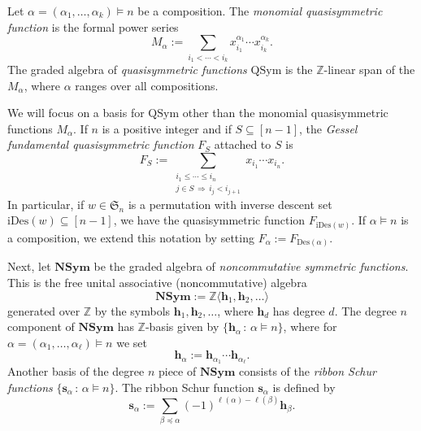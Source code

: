 \documentclass[ALCO,ThmDefs,published]{cedram}
\newcommand{\symm}{{\mathfrak{S}}}
\theoremstyle{plain}
\newcommand{\Des}{{\mathrm {Des}}}
\newcommand{\NSym}{{\mathbf {NSym}}}
\newcommand{\Sym}{{\mathrm {Sym}}}
\newcommand{\QSym}{{\mathrm {QSym}}}
\newcommand{\iDes}{{\mathrm {iDes}}}
\newcommand{\symm}{{\mathfrak{S}}}
\newcommand{\ZZ}{{\mathbb {Z}}}
\newcommand{\sss}{{\mathbf{s}}}
\begin{document}
Let $\alpha = (\alpha_1, \dots, \alpha_k) \models n$ be a composition.  The \emph{monomial quasisymmetric
function} is the formal power series
\begin{equation}
M_{\alpha} := \sum_{i_1 < \cdots < i_k} x_{i_1}^{\alpha_1} \cdots x_{i_k}^{\alpha_k}.
\end{equation}
The graded algebra of \emph{quasisymmetric functions} $\QSym$ is the $\ZZ$-linear span of the $M_{\alpha}$,
where $\alpha$ ranges over all compositions.


We will focus on a basis for $\QSym$ other than the monomial quasisymmetric functions $M_{\alpha}$.
If $n$ is a positive integer and if $S \subseteq [n-1]$, the \emph{Gessel fundamental quasisymmetric function}
$F_S$ attached to $S$ is
\begin{equation}
F_S := \sum_{\substack{i_1 \leq \cdots \leq i_n \\ j \in S \, \Rightarrow \, i_j < i_{j+1}}} x_{i_1} \cdots x_{i_n}.
\end{equation}
In particular, if $w \in \symm_n$ is a permutation with inverse descent set $\iDes(w) \subseteq [n-1]$,
we have the quasisymmetric function $F_{\iDes(w)}$.
If $\alpha \models n$ is a composition, we extend this notation by setting $F_{\alpha} := F_{\Des(\alpha)}$.



Next, let $\NSym$ be the graded algebra of \emph{noncommutative symmetric functions}.
This is the free unital associative (noncommutative) algebra
\begin{equation}
\NSym := \ZZ \langle \mathbf{h}_1, \mathbf{h}_2, \dots \rangle
\end{equation}
generated over $\ZZ$  by the symbols
$\mathbf{h}_1, \mathbf{h}_2, \dots$, where $\mathbf{h}_d$ has degree $d$.
The degree $n$
component of  $\NSym$ has $\ZZ$-basis given by $\{ \mathbf{h}_{\alpha} \,:\, \alpha \models n\}$, where
for $\alpha = (\alpha_1, \dots, \alpha_{\ell}) \models n$ we set
\begin{equation}
\mathbf{h}_{\alpha} := \mathbf{h}_{\alpha_1}  \cdots \mathbf{h}_{\alpha_{\ell}}.
\end{equation}
Another basis of the degree $n$ piece of $\NSym$ 
 consists of the \emph{ribbon Schur functions} $\{\sss_{\alpha} \,:\, \alpha \models n\}$.
 The ribbon Schur function $\sss_{\alpha}$ is defined by
 \begin{equation}
 \sss_{\alpha} := \sum_{\beta \preceq \alpha} (-1)^{\ell(\alpha) - \ell(\beta)} \mathbf{h}_{\beta}.
 \end{equation}
\end{document}
